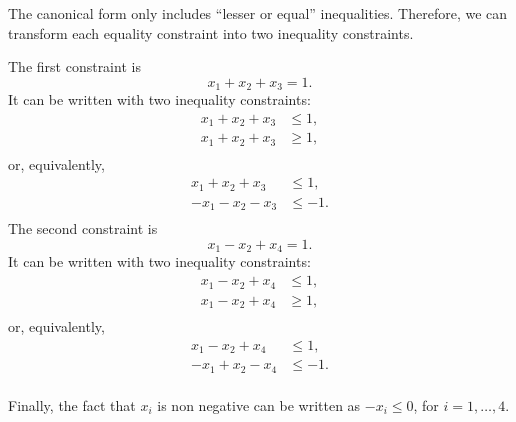 
The canonical form only includes ``lesser or equal''
inequalities. Therefore, we can transform each equality constraint
into two inequality constraints. 


The first constraint is
\begin{equation}
  \label{eq:c1}
  x_1 + x_2 + x_3 = 1.
\end{equation}
It can be written with two inequality constraints:
\begin{align*}
  x_1 + x_2 + x_3 &\leq 1, \\
  x_1 + x_2 + x_3 &\geq 1, \\
\end{align*}
or, equivalently, 
\begin{align*}
  x_1 + x_2 + x_3 &\leq 1, \\
  -x_1 - x_2 - x_3 &\leq -1. \\
\end{align*}
The second constraint is
\begin{equation}
  \label{eq:c2}
x_1 - x_2 + x_4 = 1.
\end{equation}
It can be written with two inequality constraints:
\begin{align*}
x_1 - x_2 + x_4 &\leq 1, \\
x_1 - x_2 + x_4 &\geq 1, \\
\end{align*}
or, equivalently, 
\begin{align*}
x_1 - x_2 + x_4 &\leq 1, \\
-x_1 + x_2 - x_4 &\leq -1. \\
\end{align*}

Finally, the fact that  $x_i$ is non negative can be
written as $-x_i \leq 0$, for $i=1,\ldots,4$.

